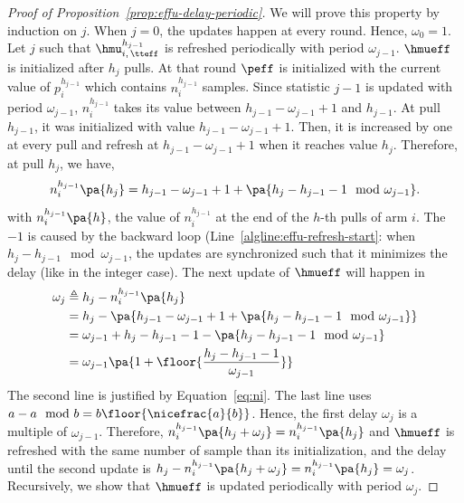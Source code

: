 \begin{proof}[Proof of Proposition~\ref{prop:effu-delay-periodic}]
We will prove this property by induction on $j$.  When $j=0$, the updates happen at every round. Hence, $\omega_0 =1$. Let $j$ such that $\hmu_{i,\,\tteff}^{h_{j-1}}$ is refreshed periodically with period $\omega_{j-1}$. $\hmueff$ is initialized after $h_j$ pulls. At that round $\peff$ is initialized with the current value of $p_i^{h_{j-1}}$ which contains $n_i^{h_{j-1}}$ samples. Since statistic $j-1$ is updated with period $\omega_{j-1}$, $n_i^{h_{j-1}}$  takes its value between $h_{j-1} -\omega_{j-1} +1$ and $h_{j-1}$. At pull $h_{j-1}$, it was initialized with value $h_{j-1} -\omega_{j-1} +1$. Then, it is increased by one at every pull and refresh at $h_{j-1} -\omega_{j-1} +1$ when it reaches value $h_j$. Therefore, at pull $h_j$, we have,
\begin{equation}
\label{eq:ni}
n_i^{h_{j-1}}\pa{h_j} = h_{j-1} -\omega_{j-1} +1 + \pa{h_j - h_{j-1} -1  \mod \omega_{j-1}}.
\end{equation}
with $n_i^{h_{j-1}}\pa{h}$, the value of $n_i^{h_{j-1}}$ at the end of the $h$-th pulls of arm $i$. The $-1$ is caused by the backward loop (Line~\ref{algline:effu-refresh-start}: when $h_j -h_{j-1} \mod \omega_{j-1}$, the updates are synchronized such that it minimizes the delay (like in the integer case). The next update of $\hmueff$ will happen in 
\begin{align*} 
\omega_j &\triangleq h_{j} - n_i^{h_{j-1}}\pa{h_j} \\
&= h_{j} - \pa{h_{j-1} -\omega_{j-1} +1 + \pa{h_j - h_{j-1} -1  \mod \omega_{j-1}}} 
\\&= \omega_{j-1} +h_j - h_{j-1} -1 -  \pa{h_j - h_{j-1} -1  \mod \omega_{j-1}} 
\\&=  \omega_{j-1}  \pa{1 + \floor{\frac{h_j - h_{j-1} -1}{\omega_{j-1}}}}
\end{align*}
The second line is justified by Equation~\ref{eq:ni}. The last line uses $a - a\mod b = b \floor{\nicefrac{a}{b}}$. Hence, the first delay $\omega_j$ is a multiple of $\omega_{j-1}$. Therefore, $n_i^{h_{j-1}}\pa{h_j + \omega_j} =n_i^{h_{j-1}}\pa{h_j}$ and $\hmueff$ is refreshed with the same number of sample than its initialization, and the delay until the second update is $h_j - n_i^{h_{j-1}}\pa{h_j + \omega_j} = n_i^{h_{j-1}}\pa{h_j}=\omega_j$. Recursively, we show that  $\hmueff$ is updated periodically with period $\omega_j$.
\end{proof}

